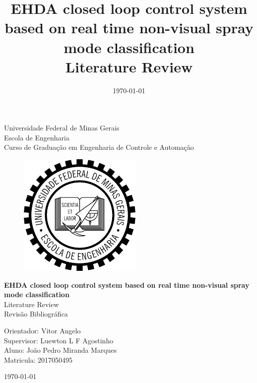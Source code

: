 \begin{titlepage}
    \begin{center}
           
    {\large Universidade Federal de Minas Gerais\\
    Escola de Engenharia \\
    Curso de Graduação em Engenharia de Controle e Automação\\}
    \vfill

    \begin{figure}[h]
        \centering
        \includegraphics[scale=0.5]{images/brasao_ufmg.png}
    \end{figure}
    \vspace{2cm}


    {\bf\Large EHDA closed loop control system based on real time non-visual spray mode classification\\}
    \vspace{1cm} 
    {\Large Literature Review \\ Revisão Bibliográfica}
    \vspace{2cm}  
    
    {\large Orientador: Vitor Angelo\\
            Supervisor: Luewton L F Agostinho}\\

    
    {\large Aluno: João Pedro Miranda Marques \\
    Matricula: 2017050495}
    \vspace{2cm}  

    \today
    \vspace{2cm}  
       

    \large \date{\today}
    \end{center}
    
    \end{titlepage}
    
    \newpage
    \clearpage
    \thispagestyle{empty}
    
    \cleardoublepage


\title{
    EHDA closed loop control system based on real time non-visual spray mode classification \\
    \large Literature Review}

